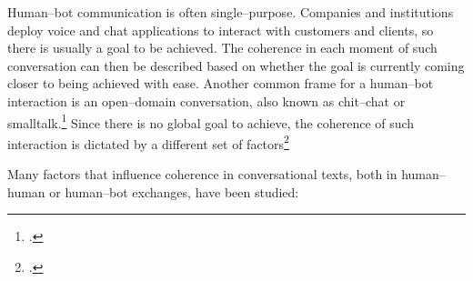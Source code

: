 \documentclass[12pt]{report}
\begin{document}
\par
Human–bot communication is often single–purpose.
Companies and institutions deploy voice and chat applications to interact with customers and clients,
so there is usually a goal to be achieved.
The coherence in each moment of such conversation can then be described based on whether
the goal is currently coming closer to being achieved with ease.
Another common frame for a human–bot interaction is an open–domain conversation,
also known as chit–chat or smalltalk.\footcite{ramnauth2024chitchatdevelopingrobotssmalltalk}
Since there is no global goal to achieve,
the coherence of such interaction is dictated by
a different set of factors\footcite{xu-etal-2021-discovering}

\par
Many factors that influence coherence in conversational texts,
both in human–human or human–bot exchanges,
have been studied:
\end{document}
